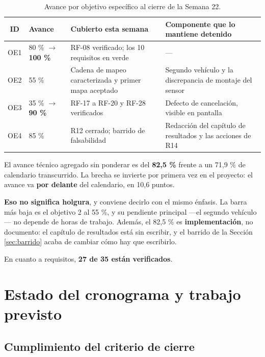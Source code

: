 \documentclass[12pt,letterpaper]{article}
\begin{document}
\begin{table}[H]
    \centering
    \small
    \caption{Avance por objetivo específico al cierre de la Semana 22.}
    \label{tab:objetivos}
    \begin{tabular}{@{}cp{2.8cm}p{4.2cm}p{4.6cm}@{}}
        \toprule
        \textbf{ID} & \textbf{Avance} & \textbf{Cubierto esta semana} & \textbf{Componente que lo mantiene detenido} \\ \midrule
        OE1 & 80 \% $\rightarrow$ \textbf{100 \%} & RF-08 verificado; los 10 requisitos en verde & --- \\ \addlinespace
        OE2 & 55 \% & Cadena de mapeo caracterizada y primer mapa aceptado & Segundo vehículo y la discrepancia de montaje del sensor \\ \addlinespace
        OE3 & 35 \% $\rightarrow$ \textbf{90 \%} & RF-17 a RF-20 y RF-28 verificados & Defecto de cancelación, visible en pantalla \\ \addlinespace
        OE4 & 85 \% & R12 cerrado; barrido de falsabilidad & Redacción del capítulo de resultados y las acciones de R14 \\ \bottomrule
    \end{tabular}
\end{table}

El avance técnico agregado sin ponderar es del \textbf{82,5 \%} frente a un 71,9 \% de calendario transcurrido. La brecha se invierte por primera vez en el proyecto: el avance va \textbf{por delante} del calendario, en 10,6 puntos.

\textbf{Eso no significa holgura}, y conviene decirlo con el mismo énfasis. La barra más baja es el objetivo 2 al 55 \%, y su pendiente principal ---el segundo vehículo--- no depende de horas de trabajo. Además, el 82,5 \% es \textbf{implementación}, no documento: el capítulo de resultados está sin escribir, y el barrido de la Sección \ref{sec:barrido} acaba de cambiar cómo hay que escribirlo.

En cuanto a requisitos, \textbf{27 de 35 están verificados}.

\section{Estado del cronograma y trabajo previsto}
\label{sec:cronograma}

\subsection{Cumplimiento del criterio de cierre}
\end{document}
